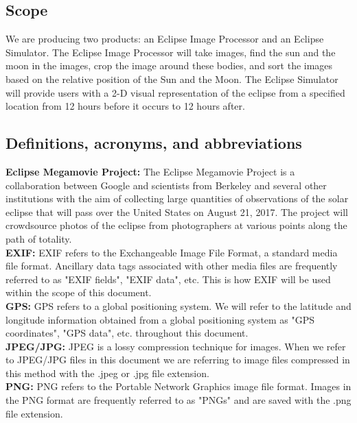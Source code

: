 \documentclass[10pt, onecolumn, draftclsnofoot, letterpaper, compsoc]{IEEEtran}
\begin{document}
\subsection{Scope}
We are producing two products: an Eclipse Image Processor and an Eclipse 
Simulator. The Eclipse Image Processor will take images, find the sun and the
moon in the images, crop the image around these bodies, and sort the images 
based on the relative position of the Sun and the Moon. The Eclipse Simulator 
will provide users with a 2-D visual representation of the eclipse from a 
specified location from 12 hours before it occurs to 12 hours after.

\subsection{Definitions, acronyms, and abbreviations}
	
	\textbf{Eclipse Megamovie Project:}
	The Eclipse Megamovie Project is a collaboration between Google 
	and scientists from Berkeley and several other institutions with the 
	aim of collecting large quantities of observations of the solar eclipse
	that will pass over the United States on August 21, 2017. The project
	will crowdsource photos of the eclipse from photographers at various 
	points along the path of totality. \\

	\noindent \textbf{EXIF:}
	EXIF refers to the Exchangeable Image File Format, a standard 
	media file format. Ancillary data tags associated with other media 
	files are frequently referred to as "EXIF fields", "EXIF data", etc.
	This is how EXIF will be used within the scope of this document. \\

	\noindent \textbf{GPS:}
	GPS refers to a global positioning system. We will refer to the
	latitude and longitude information obtained from a global positioning 
	system as "GPS coordinates", "GPS data", etc. throughout this document. \\

	\noindent \textbf{JPEG/JPG:}
	JPEG is a lossy compression technique for images. When we refer
	to JPEG/JPG files in this document we are referring to image files 
	compressed in this method with the .jpeg or .jpg file extension. \\

	\noindent \textbf{PNG:}
	PNG refers to the Portable Network Graphics image file format. 
	Images in the PNG format are frequently referred to as "PNGs" and are 
	saved with the .png file extension. 
\end{document}
